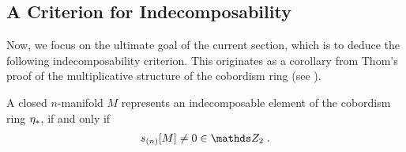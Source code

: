 \subsection{A Criterion for Indecomposability}
\label{sec:indecomposabilitycriterion}
Now, we focus on the ultimate goal of the current section, which
is to deduce the following indecomposability criterion. This
originates as a corollary from Thom's proof of the multiplicative
structure of the cobordism ring (see \cite[Section~IV.5]{thom}).
\begin{Thm}\label{thm:indecomposabilitycriterion}
  A closed $n$-manifold $M$ represents an indecomposable element of
  the cobordism ring $\eta_*$, if and only if
  \begin{gather*}
    \snum{(n)}{M} \neq 0 \in \Zmod2
    \;.
  \end{gather*}
\end{Thm}

